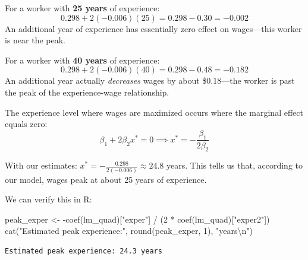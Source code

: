 \documentclass[
  letterpaper,
  DIV=11,
  numbers=noendperiod]{scrreprt}
\newenvironment{Shaded}{\begin{snugshade}}{\end{snugshade}}
\newcommand{\DecValTok}[1]{\textcolor[rgb]{0.68,0.00,0.00}{#1}}
\newcommand{\FunctionTok}[1]{\textcolor[rgb]{0.28,0.35,0.67}{#1}}
\newcommand{\NormalTok}[1]{\textcolor[rgb]{0.00,0.23,0.31}{#1}}
\newcommand{\OtherTok}[1]{\textcolor[rgb]{0.00,0.23,0.31}{#1}}
\newcommand{\SpecialCharTok}[1]{\textcolor[rgb]{0.37,0.37,0.37}{#1}}
\newcommand{\StringTok}[1]{\textcolor[rgb]{0.13,0.47,0.30}{#1}}
\begin{document}
For a worker with \textbf{25 years} of experience: \[
0.298 + 2(-0.006)(25) = 0.298 - 0.30 = -0.002
\] An additional year of experience has essentially zero effect on
wages---this worker is near the peak.

For a worker with \textbf{40 years} of experience: \[
0.298 + 2(-0.006)(40) = 0.298 - 0.48 = -0.182
\] An additional year actually \emph{decreases} wages by about
\$0.18---the worker is past the peak of the experience-wage
relationship.

\begin{tcolorbox}[enhanced jigsaw, arc=.35mm, bottomrule=.15mm, bottomtitle=1mm, breakable, colback=white, colbacktitle=quarto-callout-note-color!10!white, colframe=quarto-callout-note-color-frame, coltitle=black, left=2mm, leftrule=.75mm, opacityback=0, opacitybacktitle=0.6, rightrule=.15mm, title=\textcolor{quarto-callout-note-color}{\faInfo}\hspace{0.5em}{Finding the Peak}, titlerule=0mm, toprule=.15mm, toptitle=1mm]

The experience level where wages are maximized occurs where the marginal
effect equals zero: \[
\beta_1 + 2\beta_2 x^* = 0 \implies x^* = -\frac{\beta_1}{2\beta_2}
\]

With our estimates: \(x^* = -\frac{0.298}{2(-0.006)} \approx 24.8\)
years. This tells us that, according to our model, wages peak at about
25 years of experience.

We can verify this in R:

\begin{Shaded}
\begin{Highlighting}[]
\NormalTok{peak\_exper }\OtherTok{\textless{}{-}} \SpecialCharTok{{-}}\FunctionTok{coef}\NormalTok{(lm\_quad)[}\StringTok{"exper"}\NormalTok{] }\SpecialCharTok{/}\NormalTok{ (}\DecValTok{2} \SpecialCharTok{*} \FunctionTok{coef}\NormalTok{(lm\_quad)[}\StringTok{"exper2"}\NormalTok{])}
\FunctionTok{cat}\NormalTok{(}\StringTok{"Estimated peak experience:"}\NormalTok{, }\FunctionTok{round}\NormalTok{(peak\_exper, }\DecValTok{1}\NormalTok{), }\StringTok{"years}\SpecialCharTok{\textbackslash{}n}\StringTok{"}\NormalTok{)}
\end{Highlighting}
\end{Shaded}

\begin{verbatim}
Estimated peak experience: 24.3 years
\end{verbatim}

\end{tcolorbox}
\end{document}
